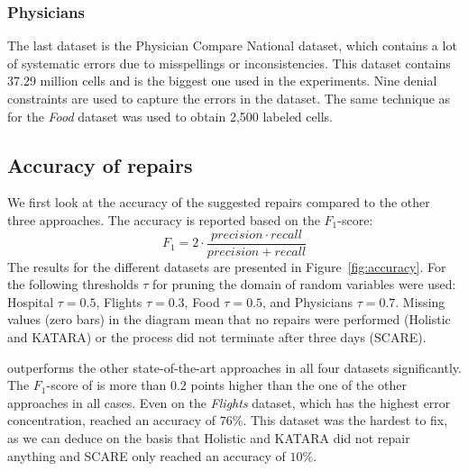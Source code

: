   \subsubsection*{Physicians}
  The last dataset is the Physician Compare National dataset, which contains a lot of systematic errors due to misspellings or inconsistencies.
  This dataset contains 37.29 million cells and is the biggest one used in the experiments.
  Nine denial constraints are used to capture the errors in the dataset.
  The same technique as for the \textit{Food} dataset was used to obtain 2,500 labeled cells.

  \subsection{Accuracy of repairs}
  We first look at the accuracy of the suggested repairs compared to the other three approaches.
  The accuracy is reported based on the $F_1$-score:
  \begin{equation}
    F_1 = 2 \cdot \frac{precision \cdot recall}{precision + recall}
  \end{equation}
  The results for the different datasets are presented in Figure~\ref{fig:accuracy}.
  For \holoclean{} the following thresholds $\tau$ for pruning the domain of random variables were used:
  Hospital $\tau = 0.5$, Flights $\tau = 0.3$, Food $\tau = 0.5$, and Physicians $\tau = 0.7$.
  Missing values (zero bars) in the diagram mean that no repairs were performed (Holistic and KATARA) or the process did not terminate after three days (SCARE).

  \holoclean{} outperforms the other state-of-the-art approaches in all four datasets significantly.
  The $F_1$-score of \holoclean{} is more than $0.2$ points higher than the one of the other approaches in all cases.
  Even on the \textit{Flights} dataset, which has the highest error concentration, \holoclean{} reached an accuracy of $76\%$.
  This dataset was the hardest to fix, as we can deduce on the basis that Holistic and KATARA did not repair anything and SCARE only reached an accuracy of $10\%$.

